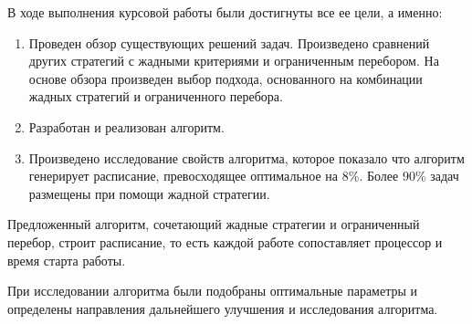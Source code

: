 В ходе выполнения курсовой работы были достигнуты все ее цели, а именно:
\begin{enumerate}
    \item Проведен обзор существующих решений задач. Произведено сравнений других стратегий с жадными критериями и ограниченным перебором. На основе обзора произведен выбор подхода, основанного на комбинации жадных стратегий и ограниченного перебора. 
    \item Разработан и реализован алгоритм.
    \item Произведено исследование свойств алгоритма, которое показало что алгоритм генерирует расписание, превосходящее оптимальное на 8\%. Более 90\% задач размещены при помощи жадной стратегии.
\end{enumerate}

Предложенный алгоритм, сочетающий жадные стратегии и ограниченный перебор, строит расписание, то есть каждой работе сопоставляет процессор и время старта работы.

При исследовании алгоритма были подобраны оптимальные параметры и определены направления дальнейшего улучшения и исследования алгоритма. 